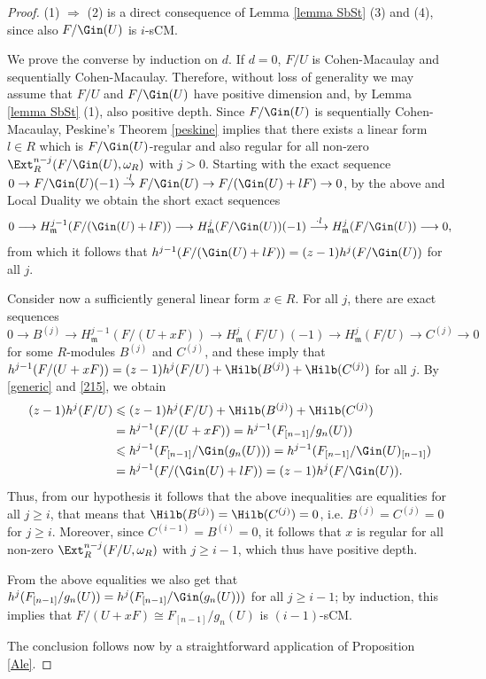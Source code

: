 \documentclass[12pt]{amsart}
\theoremstyle{definition}
\theoremstyle{definition}
\def\frk{\mathfrak}               %
\def\mm{{\frk m}}
\renewcommand{\leq}{\leqslant}
\renewcommand{\geq}{\geqslant}
\let\lra\longrightarrow
\begin{document}
\begin{proof}
(1) $\Rightarrow$ (2) is a direct consequence of Lemma \ref{lemma SbSt} (3) and (4), since also $F/\Gin(U)$ is $i$-sCM.
    
\smallskip
\noindent
We prove the converse by induction on $d$. If $d=0$, $F/U$ is Cohen-Macaulay and  sequentially Cohen-Macaulay. Therefore, without loss of generality we may assume that $F/U$ and $F/\Gin(U)$ have positive dimension and, by Lemma 
\ref{lemma SbSt} (1), also positive depth.
Since $F/\Gin(U)$ is sequentially Cohen-Macaulay, Peskine's Theorem \ref{peskine} implies that there exists a linear form $l \in R$ which is $F/\Gin(U)$-regular and also regular for all non-zero $\Ext^{n-j}_R(F/\Gin(U),\omega_R)$ with $j>0$. 
Starting with the exact sequence $0 \rightarrow F/\Gin(U) (-1) \stackrel{\cdot l}\rightarrow F/\Gin(U) \rightarrow F/(\Gin(U)+lF) \rightarrow 0$, by the above and Local Duality we obtain the short exact sequences
$$
0 \lra H^{j-1}_{\mm}(F/(\Gin(U)+lF)) \lra H^j_{\mm}(F/\Gin(U))(-1) \stackrel{\cdot l}\lra H^j_{\mm}(F/\Gin(U)) \lra 0,
$$ 
 from which it follows that $h^{j-1}(F/(\Gin(U)+lF))=(z-1)h^j(F/\Gin(U))$ for all $j$.

Consider now a sufficiently general linear form $x \in R$. For all $j$, there are exact sequences 
$$
0 \lra B^{(j)} \lra H^{j-1}_{\mm}(F/(U+xF)) \lra H^j_{\mm}(F/U)(-1) \lra H^j_{\mm}(F/U) \lra C^{(j)} \lra 0
$$
for some $R$-modules $B^{(j)}$ and $C^{(j)}$, and these imply that $h^{j-1}(F/(U+xF)) = (z-1)h^j(F/U)+\Hilb(B^{(j)})+\Hilb(C^{(j)})$ for all $j$.
By \eqref{generic} and \eqref{215}, we obtain
\begin{equation*}\begin{split}
(z-1)h^j(F/U) &\leq (z-1)h^j(F/U)+\Hilb(B^{(j)})+\Hilb(C^{(j)}) \\
&=h^{j-1}(F/(U+xF))=h^{j-1}(F_{[n-1]}/g_n(U))  \\
& \leq  h^{j-1}(F_{[n-1]}/\Gin(g_n(U))) 
=h^{j-1}(F_{[n-1]}/\Gin(U)_{[n-1]}) \\
&= h^{j-1}(F/(\Gin(U)+lF))=(z-1)h^j(F/\Gin(U)).
\end{split}
\end{equation*}
Thus, from our hypothesis it follows that the above inequalities are equalities for all $j \geq i$, that  means that $\Hilb(B^{(j)})=\Hilb(C^{(j)})=0$, i.e. $B^{(j)}=C^{(j)}=0$ for  $j\geq i$. Moreover, since $C^{(i-1)}=B^{(i)}=0$, it follows that $x$ is regular for all non-zero $\Ext_R^{n-j}(F/U,\omega_R)$ with  $j\geq i-1$, which thus have positive depth.

\noindent
From the above equalities we also get that $h^{j}(F_{[n-1]}/g_n(U)) = h^{j}(F_{[n-1]}/\Gin(g_n(U)))$ for all $j \geq i-1$; by induction, this implies that $F/(U+xF)\cong F_{[n-1]}/g_n(U) $ is $(i-1)$-sCM.  

\noindent The conclusion follows now by a straightforward application of Proposition \ref{Ale}.
\end{proof}
\end{document}
